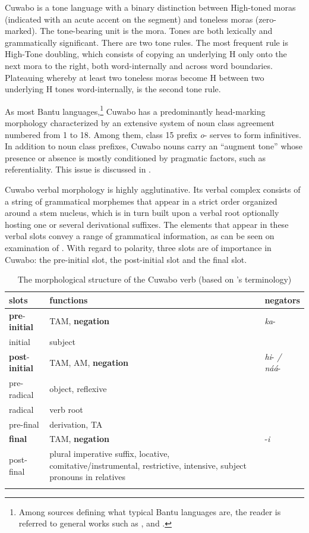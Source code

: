 \documentclass[output=paper,colorlinks=true, citecolor=brown,draftmode]{langscibook}
\begin{document}
Cuwabo is a tone language with a binary distinction between High-toned moras (indicated with an acute accent on the segment) and toneless moras (zero-marked). The tone-bearing unit is the mora. Tones are both lexically and grammatically significant. There are two tone rules. The most frequent rule is High-Tone doubling, which consists of copying an underlying H only onto the next mora to the right, both word-internally and across word boundaries. Plateauing whereby at least two toneless moras become H between two underlying H tones word-internally, is the second tone rule. 

As most Bantu languages,\footnote{Among sources defining what typical Bantu languages are, the reader is referred to general works such as \citet[11--42]{WilliamsonBlench2000}, \citet{NursePhilippson2003} and \citet{VandeVeldeEtAl2019}.} Cuwabo has a predominantly head-marking morphology characterized by an extensive system of noun class agreement numbered from 1 to 18. Among them, class 15 prefix \textit{o}{}- serves to form infinitives. In addition to noun class prefixes, Cuwabo nouns carry an “augment tone” whose presence or absence is mostly conditioned by pragmatic factors, such as referentiality. This issue is discussed in .

Cuwabo verbal morphology is highly agglutinative. Its verbal complex consists of a string of grammatical morphemes that appear in a strict order organized around a stem nucleus, which is in turn built upon a verbal root optionally hosting one or several derivational suffixes. The elements that appear in these verbal slots convey a range of grammatical information, as can be seen on examination of . With regard to polarity, three slots are of importance in Cuwabo: the pre-initial slot, the post-initial slot and the final slot.

\begin{table}
\begin{tabularx}{\textwidth}{lQl}
\lsptoprule
{slots} & {functions} & {negators} \\
\midrule
{\textbf{pre}{}-\textbf{initial}} & {TAM, \textbf{negation}} & {\textit{ka}{}-} \\
{initial} &{subject} & \\
{\textbf{post}{}-\textbf{initial}} &{TAM, AM, \textbf{negation}} & {\textit{hi}{}- \textit{/ náá}{}-}\\
{pre-radical} &{object, reflexive} &  \\
{radical} &{verb root} &  \\
{pre-final} &{derivation, TA} &  \\
{\bfseries final} &{TAM, \textbf{negation}} & {{}-\textit{i}}\\
{post-final} & {plural imperative suffix, locative, comitative/instrumental, restrictive, intensive, subject pronouns in relatives} &  \\
\lspbottomrule
\end{tabularx}
\caption{The morphological structure of the Cuwabo verb (based on \citeauthor{Güldemann1999}'s \citeyear{Güldemann1999} terminology)}
\label{tab:cuw:1}
\end{table}
\end{document}

